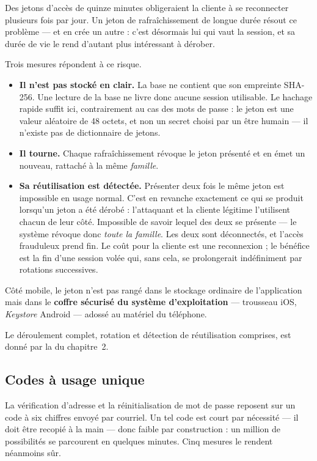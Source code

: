 Des jetons d'accès de quinze minutes obligeraient la cliente à se reconnecter
plusieurs fois par jour. Un jeton de rafraîchissement de longue durée résout ce
problème --- et en crée un autre : c'est désormais lui qui vaut la session, et
sa durée de vie le rend d'autant plus intéressant à dérober.

Trois mesures répondent à ce risque.

\begin{itemize}[leftmargin=1.2cm]
  \item \textbf{Il n'est pas stocké en clair.} La base ne contient que son
  empreinte SHA-256. Une lecture de la base ne livre donc aucune session
  utilisable. Le hachage rapide suffit ici, contrairement au cas des mots de
  passe : le jeton est une valeur aléatoire de 48 octets, et non un secret
  choisi par un être humain --- il n'existe pas de dictionnaire de jetons.

  \item \textbf{Il tourne.} Chaque rafraîchissement révoque le jeton présenté
  et en émet un nouveau, rattaché à la même \emph{famille}.

  \item \textbf{Sa réutilisation est détectée.} Présenter deux fois le même
  jeton est impossible en usage normal. C'est en revanche exactement ce qui se
  produit lorsqu'un jeton a été dérobé : l'attaquant et la cliente légitime
  l'utilisent chacun de leur côté. Impossible de savoir lequel des deux se
  présente --- le système révoque donc \emph{toute la famille}. Les deux sont
  déconnectés, et l'accès frauduleux prend fin. Le coût pour la cliente est une
  reconnexion ; le bénéfice est la fin d'une session volée qui, sans cela, se
  prolongerait indéfiniment par rotations successives.
\end{itemize}

Côté mobile, le jeton n'est pas rangé dans le stockage ordinaire de
l'application mais dans le \textbf{coffre sécurisé du système
d'exploitation} --- trousseau iOS, \textit{Keystore} Android --- adossé au
matériel du téléphone.

Le déroulement complet, rotation et détection de réutilisation comprises, est
donné par la  du chapitre~2.

\subsection{Codes à usage unique}

La vérification d'adresse et la réinitialisation de mot de passe reposent sur
un code à six chiffres envoyé par courriel. Un tel code est court par
nécessité --- il doit être recopié à la main --- donc faible par construction :
un million de possibilités se parcourent en quelques minutes. Cinq mesures le
rendent néanmoins sûr.

